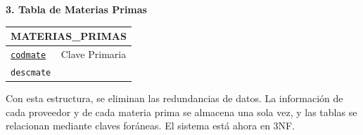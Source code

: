 \documentclass[12pt, a4paper]{article}
\newcommand{\pk}[1]{\underline{\texttt{#1}}}      %
\begin{document}
\vspace{0.5cm}
\begin{center}
    \textbf{3. Tabla de Materias Primas}

    \vspace{0.2cm}
    \begin{tabular}{|l|l|}
    \hline
    \multicolumn{2}{|c|}{\textbf{MATERIAS\_PRIMAS}} \\
    \hline
    \pk{codmate} & Clave Primaria \\
    \texttt{descmate} & \\
    \hline
    \end{tabular}
\end{center}
\vspace{1cm}

Con esta estructura, se eliminan las redundancias de datos. La información de cada proveedor y de cada materia prima se almacena una sola vez, y las tablas se relacionan mediante claves foráneas. El sistema está ahora en 3NF.
\end{document}
